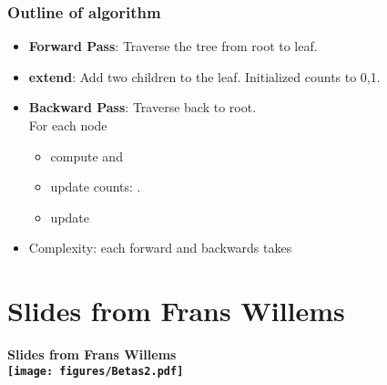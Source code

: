 \documentclass{beamer}
\begin{document}
\begin{frame}
\frametitle{Outline of algorithm}
\begin{itemize}
\item {\bf Forward Pass}: Traverse the tree from root to leaf.
\item {\bf extend}: Add two children to the leaf. Initialized counts
  to 0,1.
\item {\bf Backward Pass}: Traverse back to root.\\
  For each node
  \begin{itemize}
  \item compute  and
    \item update counts: .
    \item update 
    \end{itemize}
    \item Complexity: each forward and backwards takes 
  \end{itemize}
\end{frame}

\section{Slides from Frans Willems}

\newpage
\bf{Slides from Frans Willems}\\
\texttt{[image: figures/Betas2.pdf]}



\iffalse


\fi
\end{document}
